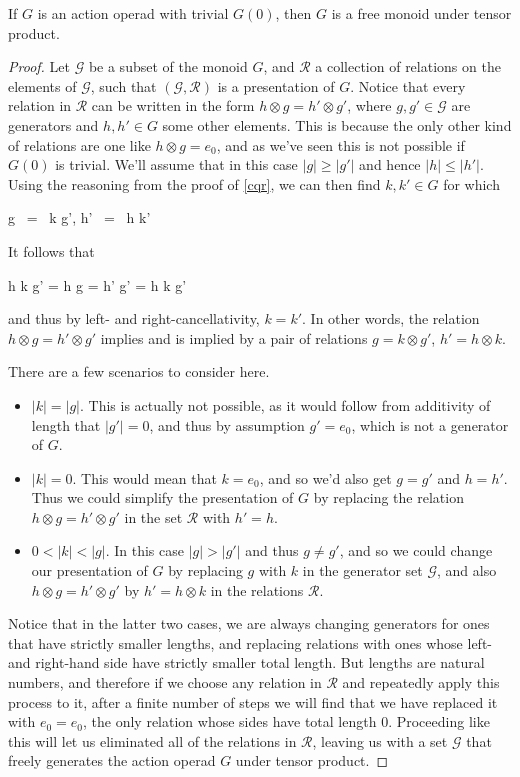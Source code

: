 \documentclass{amsbook} %
\newenvironment{eq*}{\begin{equation*}}{\end{equation*}}
\numberwithin{section}{chapter}
\begin{document}
\begin{prop} \label{Gfree} If $G$ is an action operad with trivial $G(0)$, then $G$ is a free monoid under tensor product.
\end{prop}
\begin{proof}
Let $\mathcal{G}$ be a subset of the monoid $G$, and $\mathcal{R}$ a collection of relations on the elements of $\mathcal{G}$, such that $(\mathcal{G},\mathcal{R})$ is a presentation of $G$. Notice that every relation in $\mathcal{R}$ can be written in the form $h \otimes g = h' \otimes g'$, where $g,g' \in \mathcal{G}$ are generators and $h,h' \in G$ some other elements. This is because the only other kind of relations are one like $h \otimes g = e_0$, and as we've seen this is not possible if $G(0)$ is trivial. We'll assume that in this case $|g| \ge |g'|$ and hence $|h| \le |h'|$. Using the reasoning from the proof of \cref{cqr}, we can then find $k, k' \in G$ for which
\begin{eq*} g \, = \, k \otimes g', \quad \quad \quad h' \, = \, h \otimes k' \end{eq*}
It follows that
\begin{eq*} h \otimes k \otimes g' \quad = \quad h \otimes g \quad = \quad h' \otimes g' \quad = \quad h \otimes k \otimes g' \end{eq*}
and thus by left- and right-cancellativity, $k = k'$.  In other words, the relation $h \otimes g = h' \otimes g'$ implies and is implied by a pair of relations $g = k \otimes g'$, $h' = h \otimes k$. 

There are a few scenarios to consider here. 
\begin{itemize}
\item $|k| = |g|$. This is actually not possible, as it would follow from additivity of length that $|g'|=0$, and thus by assumption $g' = e_0$, which is not a generator of $G$.
\item $|k|=0$. This would mean that $k=e_0$, and so we'd also get $g=g'$ and $h = h'$. Thus we could simplify the presentation of $G$ by replacing the relation $h \otimes g = h' \otimes g'$ in the set $\mathcal{R}$ with $h' = h$.
\item $0 < |k| < |g|$. In this case $|g| > |g'|$ and thus $g \neq g'$, and so we could change our presentation of $G$ by replacing $g$ with $k$ in the generator set $\mathcal{G}$, and also $h \otimes g = h' \otimes g'$ by $h' = h \otimes k$ in the relations $\mathcal{R}$.
\end{itemize}
Notice that in the latter two cases, we are always changing generators for ones that have strictly smaller lengths, and replacing relations with ones whose left- and right-hand side have strictly smaller total length. But lengths are natural numbers, and therefore if we choose any relation in $\mathcal{R}$ and repeatedly apply this process to it, after a finite number of steps we will find that we have replaced it with $e_0 = e_0$, the only relation whose sides have total length $0$. Proceeding like this will let us eliminated all of the relations in $\mathcal{R}$, leaving us with a set $\mathcal{G}$ that freely generates the action operad $G$ under tensor product.
\end{proof} 
\end{document}
